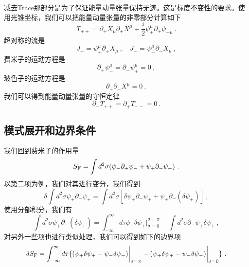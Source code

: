 减去Trace那部分是为了保证能量动量张量保持无迹。这是标度不变性的要求。使用光锥坐标，我们可以把能量动量张量的非零部分计算如下
\begin{equation}
T_{++} = \partial_+X_\mu\partial_+X^\mu + \frac{i}{2} \psi^\mu_+ \partial_+ \psi_{+\mu}~.
\end{equation}
超对称的流是
\begin{equation}
J_+ = \psi^\mu_+ \partial_+ X_\mu~, \quad J_- = \psi^\mu_- \partial_- X_\mu ~,
\end{equation}
费米子的运动方程是
\begin{equation}
\partial_+\psi^\mu_- = \partial_- \psi^\mu_+ = 0~,
\end{equation}
玻色子的运动方程是
\begin{equation}
\partial_+\partial_- X^\mu = 0~,
\end{equation}
我们可以得到能量动量张量的守恒定律
\begin{equation}
\partial_- T_{++} = \partial_+ T_{--} = 0~.
\end{equation}

\subsection{模式展开和边界条件}
我们回到费米子的作用量
\begin{equation}
S_{\rm F} = \int d^2\sigma (\psi_-\partial_+\psi_-+\psi_+\partial_-\psi_+)~.
\end{equation}
以第二项为例，我们对其进行变分，我们得到
\begin{equation}
\delta \int d^2\sigma\psi_+ \partial_- \psi_+ = \int d^2\sigma [\delta\psi_+\partial_-\psi_+ + \psi_+ \partial_- (\delta\psi_+)]~,
\end{equation}
使用分部积分，我们有
\begin{equation}
\int d^2\sigma \psi_+ \partial_- (\delta\psi_+) = \int_{-\infty}^{\infty} d \tau \psi_+ \delta\psi_+ \bigg|_{\sigma = 0}^{\sigma = \pi} - \int d^2\sigma \partial_-\psi_+\delta\psi_+~,
\end{equation}
对另外一些项也进行类似处理，我们可以得到如下的边界项
\begin{equation}
\delta S_{\rm F} = \int_{-\infty}^{\infty} d\tau \{ (\psi_+\delta \psi_+ - \psi_-\delta \psi_-) \bigg|_{\sigma = \pi} - (\psi_+\delta\psi_+ - \psi_-\delta\psi_-) \bigg|_{\sigma = 0} \}~.
\end{equation}

